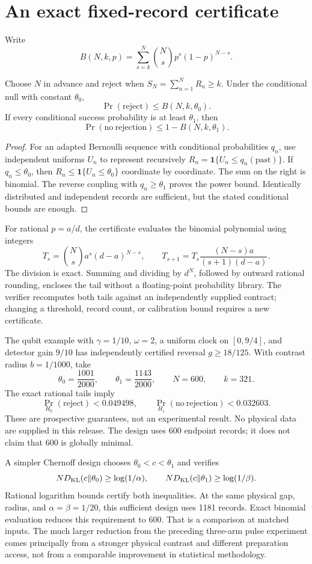 \section{An exact fixed-record certificate}
Write
\[
 B(N,k,p)=\sum_{s=k}^N {N\choose s}p^s(1-p)^{N-s}.
\]
\begin{proposition}
Choose $N$ in advance and reject when $S_N=\sum_{n=1}^N R_n\geq k$.
Under the conditional null with constant $\theta_0$,
\[
 \Pr(\mathrm{reject})\leq B(N,k,\theta_0).
\]
If every conditional success probability is at least $\theta_1$, then
\[
 \Pr(\mathrm{no\ rejection})\leq1-B(N,k,\theta_1).
\]
\end{proposition}
\begin{proof}
For an adapted Bernoulli sequence with conditional probabilities $q_n$,
use independent uniforms $U_n$ to represent recursively
$R_n=\mathbf1\{U_n\leq q_n(\text{past})\}$. If $q_n\leq\theta_0$,
then $R_n\leq\mathbf1\{U_n\leq\theta_0\}$ coordinate by coordinate.
The sum on the right is binomial. The reverse coupling with
$q_n\geq\theta_1$ proves the power bound. Identically distributed and
independent records are sufficient, but the stated conditional bounds
are enough.
\end{proof}

For rational $p=a/d$, the certificate evaluates the binomial polynomial
using integers
\[
 T_s={N\choose s}a^s(d-a)^{N-s},\qquad
 T_{s+1}=T_s\frac{(N-s)a}{(s+1)(d-a)}.
\]
The division is exact. Summing and dividing by $d^N$, followed by outward
rational rounding, encloses the tail without a floating-point probability
library. The verifier recomputes both tails against an independently
supplied contract; changing a threshold, record count, or calibration
bound requires a new certificate.

The qubit example with $\gamma=1/10$, $\omega=2$, a uniform clock on
$[0,9/4]$, and detector gain $9/10$ has independently certified reversal
$g\geq18/125$. With contrast radius $b=1/1000$, take
\[
 \theta_0=\frac{1001}{2000},\qquad
 \theta_1=\frac{1143}{2000},\qquad N=600,\qquad k=321.
\]
The exact rational tails imply
\[
 \Pr_{H_0}(\mathrm{reject})<0.049498,\qquad
 \Pr_{H_1}(\mathrm{no\ rejection})<0.032603.
\]
These are prospective guarantees, not an experimental result. No physical
data are supplied in this release. The design uses 600 endpoint records;
it does not claim that 600 is globally minimal.

A simpler Chernoff design chooses $\theta_0<c<\theta_1$ and verifies
\[
 N D_{\rm KL}(c\Vert\theta_0)\geq\log(1/\alpha),\qquad
 N D_{\rm KL}(c\Vert\theta_1)\geq\log(1/\beta).
\]
Rational logarithm bounds certify both inequalities. At the same physical
gap, radius, and $\alpha=\beta=1/20$, this sufficient design uses 1181
records. Exact binomial evaluation reduces this requirement to 600.
That is a comparison at matched inputs. The much larger reduction from
the preceding three-arm pulse experiment comes principally from a stronger
physical contrast and different preparation access, not from a comparable
improvement in statistical methodology.

